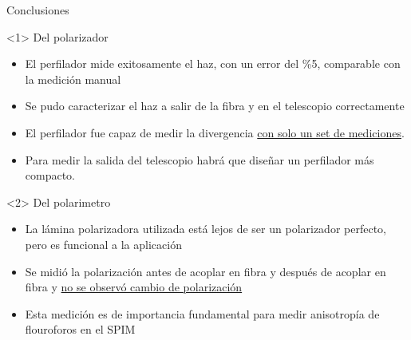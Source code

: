 \begin{frame}{Conclusiones}
    \begin{onlyenv}<1>
    Del polarizador
        \begin{itemize}
            \item El perfilador mide exitosamente el haz, con un error del \%5, comparable con la medición manual 
            \item Se pudo caracterizar el haz a salir de la fibra y en el telescopio correctamente
            \item El perfilador fue capaz de medir la divergencia \underline{con solo un set de mediciones}.
            \item Para medir la salida del telescopio habrá que diseñar un perfilador más compacto.
        \end{itemize}
    \end{onlyenv}
    
    \begin{onlyenv}<2>
        Del polarimetro
        \begin{itemize}
            \item La lámina polarizadora utilizada está lejos de ser un polarizador perfecto, pero es funcional a la aplicación
            \item Se midió la polarización antes de acoplar en fibra y después de acoplar en fibra y \underline{no se observó cambio de polarización}
            \item Esta medición es de importancia fundamental para medir anisotropía de flouroforos en el SPIM
        \end{itemize}
    \end{onlyenv}
\end{frame}
